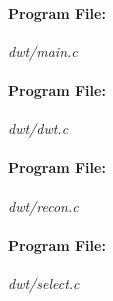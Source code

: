 \documentclass[a4paper,11pt]{report}
\begin{document}
\paragraph{Program File:} \textit{dwt/main.c}
\vspace{5pt}
{\scriptsize
\begin{lgrind}

\end{lgrind}
}

\paragraph{Program File:} \textit{dwt/dwt.c}
\vspace{5pt}
{\scriptsize
\begin{lgrind}

\end{lgrind}
}

\paragraph{Program File:} \textit{dwt/recon.c}
\vspace{5pt}
{\scriptsize
\begin{lgrind}

\end{lgrind}
}

\paragraph{Program File:} \textit{dwt/select.c}
\vspace{5pt}
{\scriptsize
\begin{lgrind}

\end{lgrind}
}

\clearpage



\end{document}
